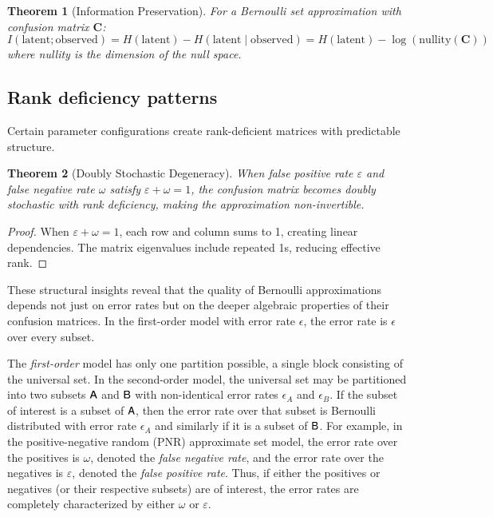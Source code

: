 \documentclass[10pt,final,hidelinks]{article}
\numberwithin{equation}{section}
\newcommand{\fprate}{\varepsilon}
\newcommand{\fnrate}{\omega}
\newcommand{\envnumstyle}{chapter}
\renewcommand{\envnumstyle}{chapter}
\renewcommand{\envnumstyle}{section}
\theoremstyle{plain}
\newtheorem{theorem}{Theorem}[\envnumstyle]
\begin{document}
\begin{theorem}[Information Preservation]
\label{thm:info_preserve}
For a Bernoulli set approximation with confusion matrix $\mathbf{C}$:
\begin{equation}
I(\text{latent}; \text{observed}) = H(\text{latent}) - H(\text{latent} \mid \text{observed}) = H(\text{latent}) - \log(\text{nullity}(\mathbf{C}))
\end{equation}
where nullity is the dimension of the null space.
\end{theorem}

\subsection{Rank deficiency patterns}

Certain parameter configurations create rank-deficient matrices with predictable structure.

\begin{theorem}[Doubly Stochastic Degeneracy]
When false positive rate $\fprate$ and false negative rate $\fnrate$ satisfy $\fprate + \fnrate = 1$, the confusion matrix becomes doubly stochastic with rank deficiency, making the approximation non-invertible.
\end{theorem}

\begin{proof}
When $\fprate + \fnrate = 1$, each row and column sums to 1, creating linear dependencies. The matrix eigenvalues include repeated 1s, reducing effective rank.
\end{proof}

These structural insights reveal that the quality of Bernoulli approximations depends not just on error rates but on the deeper algebraic properties of their confusion matrices.
In the first-order model with error rate $\epsilon$, the error rate is $\epsilon$ over every subset.


The \emph{first-order} model has only one partition possible, a single block consisting of the universal set.
In the second-order model, the universal set may be partitioned into two subsets $\Set{A}$ and $\Set{B}$ with non-identical error rates $\epsilon_A$ and $\epsilon_B$.
If the subset of interest is a subset of $\Set{A}$, then the error rate over that subset is Bernoulli distributed with error rate $\epsilon_A$ and similarly if it is a subset of $\Set{B}$.
For example, in the positive-negative random (PNR) approximate set model, the error rate over the positives is $\fnrate$, denoted the \emph{false negative rate}, and the error rate over the negatives is $\fprate$, denoted the \emph{false positive rate}.
Thus, if either the positives or negatives (or their respective subsets) are of interest, the error rates are completely characterized by either $\fnrate$ or $\fprate$.
\end{document}
